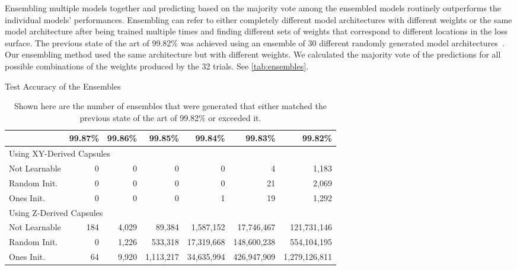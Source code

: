 \documentclass{article}
\begin{document}
Ensembling multiple models together and predicting based on the majority vote among the ensembled models routinely outperforms the individual models' performances.  Ensembling can refer to either completely different model architectures with different weights or the same model architecture after being trained multiple times and finding different sets of weights that correspond to different locations in the loss surface.  The previous state of the art of 99.82\% was achieved using an ensemble of 30 different randomly generated model architectures~\cite{Kowsari2018}.  Our ensembling method used the same architecture but with different weights.  We calculated the majority vote of the predictions for all possible combinations of the weights produced by the 32 trials.  See \autoref{tab:ensembles}.

\begin{table}[!ht]
  \centering
  \begin{minipage}{\textwidth}
    \caption{Test Accuracy of the Ensembles}
    \begin{tabularx}{\textwidth}{@{}Xrrrrrr@{}}
      \toprule
	      & 99.87\% & 99.86\% & 99.85\% & 99.84\% & 99.83\% & 99.82\% \\
      \midrule
        \multicolumn{7}{l}{Using XY-Derived Capsules} \\
      \midrule
        \hspace{.2in} Not Learnable & 0 & 0 & 0 & 0 & 4 & 1,183 \\
	      \hspace{.2in} Random Init. & 0 & 0 & 0 & 0 & 21 & 2,069 \\
	      \hspace{.2in} Ones Init. & 0 & 0 & 0 & 1 & 19 & 1,292 \\
      \midrule
        \multicolumn{7}{l}{Using Z-Derived Capsules} \\
      \midrule
        \hspace{.2in} Not Learnable & 184 & 4,029 & 89,384 & 1,587,152 & 17,746,467 & 121,731,146 \\
        \hspace{.2in} Random Init. & 0 & 1,226 & 533,318 & 17,319,668 & 148,600,238 & 554,104,195 \\
        \hspace{.2in} Ones Init. & 64 & 9,920 & 1,113,217 & 34,635,994 & 426,947,909 & 1,279,126,811 \\
      \bottomrule
    \end{tabularx}\\[0.05in]\label{tab:ensembles}
    \captionsetup{justification=justified,singlelinecheck=false}
    \caption*{Shown here are the number of ensembles that were generated that either matched the previous state of the art of 99.82\% or exceeded it.}
  \end{minipage}
\end{table}
\end{document}

